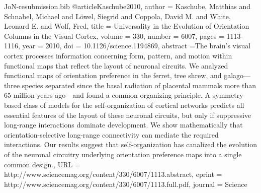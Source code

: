 \documentclass{article}
\begin{document}
\begin{filecontents}{JoN-resubmission.bib}
@article{Kaschube2010,
author = {Kaschube, Matthias and Schnabel, Michael and Löwel, Siegrid and Coppola, David M. and White, Leonard E. and Wolf, Fred},
title = {Universality in the Evolution of Orientation Columns in the Visual Cortex},
volume = {330},
number = {6007},
pages = {1113-1116},
year = {2010},
doi = {10.1126/science.1194869},
abstract ={The brain’s visual cortex processes information concerning form, pattern, and motion within functional maps that reflect the layout of neuronal circuits. We analyzed functional maps of orientation preference in the ferret, tree shrew, and galago—three species separated since the basal radiation of placental mammals more than 65 million years ago—and found a common organizing principle. A symmetry-based class of models for the self-organization of cortical networks predicts all essential features of the layout of these neuronal circuits, but only if suppressive long-range interactions dominate development. We show mathematically that orientation-selective long-range connectivity can mediate the required interactions. Our results suggest that self-organization has canalized the evolution of the neuronal circuitry underlying orientation preference maps into a single common design.},
URL = {http://www.sciencemag.org/content/330/6007/1113.abstract},
eprint = {http://www.sciencemag.org/content/330/6007/1113.full.pdf},
journal = {Science}
}


\end{filecontents}
\end{document}
